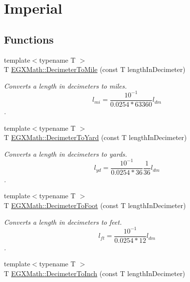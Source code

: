 \hypertarget{group___e_g_x_math-_conversions-_length_conversions-_s_i-_decimeter-_imperial}{}\section{Imperial}
\label{group___e_g_x_math-_conversions-_length_conversions-_s_i-_decimeter-_imperial}
\subsection*{Functions}
\begin{DoxyCompactItemize}
\item 
{\footnotesize template$<$typename T $>$ }\\T \mbox{\hyperlink{group___e_g_x_math-_conversions-_length_conversions-_s_i-_decimeter-_imperial_gab7d9d207fb6aa53999300baf5d9cea16}{E\+G\+X\+Math\+::\+Decimeter\+To\+Mile}} (const T length\+In\+Decimeter)
\begin{DoxyCompactList}\small\item\em Converts a length in decimeters to miles. \[ l_{mi}=\frac{10^{-1}}{0.0254 * 63360} l_{dm} \]. \end{DoxyCompactList}\item 
{\footnotesize template$<$typename T $>$ }\\T \mbox{\hyperlink{group___e_g_x_math-_conversions-_length_conversions-_s_i-_decimeter-_imperial_ga2ffbd73da0cc3cbb36822127433e3267}{E\+G\+X\+Math\+::\+Decimeter\+To\+Yard}} (const T length\+In\+Decimeter)
\begin{DoxyCompactList}\small\item\em Converts a length in decimeters to yards. \[ l_{yd}= \frac{10^{-1}}{0.0254 * 36} \frac{1}{36} l_{dm} \]. \end{DoxyCompactList}\item 
{\footnotesize template$<$typename T $>$ }\\T \mbox{\hyperlink{group___e_g_x_math-_conversions-_length_conversions-_s_i-_decimeter-_imperial_gaf86c80f8ce1e5ab6113a2a912c1f446e}{E\+G\+X\+Math\+::\+Decimeter\+To\+Foot}} (const T length\+In\+Decimeter)
\begin{DoxyCompactList}\small\item\em Converts a length in decimeters to feet. \[ l_{ft}= \frac{10^{-1}}{0.0254 * 12} l_{dm} \]. \end{DoxyCompactList}\item 
{\footnotesize template$<$typename T $>$ }\\T \mbox{\hyperlink{group___e_g_x_math-_conversions-_length_conversions-_s_i-_decimeter-_imperial_ga51bb6347b1c3ca746b7a3eadc3852e37}{E\+G\+X\+Math\+::\+Decimeter\+To\+Inch}} (const T length\+In\+Decimeter)

\end{DoxyCompactItemize}
